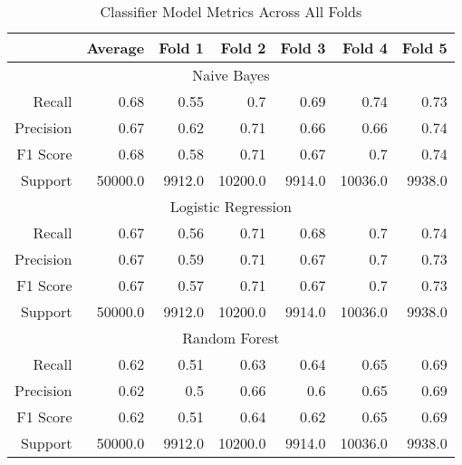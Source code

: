 \begin{table}[h]
    \centering
    \begin{tabular}{r|r|r|r|r|r|r}
        & Average & Fold 1 & Fold 2 & Fold 3 & Fold 4 & Fold 5 \\\hline
        \multicolumn{7}{c}{Naive Bayes} \\\hline
        Recall      & 0.68 & 0.55 & 0.7 & 0.69 & 0.74 & 0.73 \\
        Precision   & 0.67 & 0.62 & 0.71 & 0.66 & 0.66 & 0.74 \\
        F1 Score    & 0.68 & 0.58 & 0.71 & 0.67 & 0.7 & 0.74 \\
        Support     & 50000.0 & 9912.0 & 10200.0 & 9914.0 & 10036.0 & 9938.0 \\\hline
        \multicolumn{7}{c}{Logistic Regression} \\\hline
        Recall      & 0.67 & 0.56 & 0.71 & 0.68 & 0.7 & 0.74 \\
        Precision   & 0.67 & 0.59 & 0.71 & 0.67 & 0.7 & 0.73 \\
        F1 Score    & 0.67 & 0.57 & 0.71 & 0.67 & 0.7 & 0.73 \\
        Support     & 50000.0 & 9912.0 & 10200.0 & 9914.0 & 10036.0 & 9938.0 \\\hline
        \multicolumn{7}{c}{Random Forest} \\\hline
        Recall      & 0.62 & 0.51 & 0.63 & 0.64 & 0.65 & 0.69 \\
        Precision   & 0.62 & 0.5 & 0.66 & 0.6 & 0.65 & 0.69 \\
        F1 Score    & 0.62 & 0.51 & 0.64 & 0.62 & 0.65 & 0.69 \\
        Support     & 50000.0 & 9912.0 & 10200.0 & 9914.0 & 10036.0 & 9938.0 \\\hline
    \end{tabular}
    \caption{Classifier Model Metrics Across All Folds}
    \label{tab:combined_fold_metrics}
\end{table}